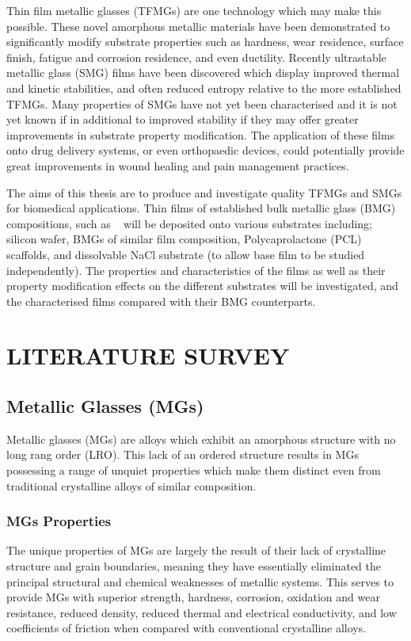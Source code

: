 \documentclass[a4paper,12pt,oneside]{report}%
\begin{document}
Thin film metallic glasses (TFMGs) are one technology which may make this possible. These novel amorphous metallic materials have been demonstrated to significantly modify substrate properties such as hardness, wear residence, surface finish, fatigue and corrosion residence, and even ductility. Recently ultrastable metallic glass (SMG) films have been discovered which display improved thermal and kinetic stabilities, and often reduced entropy relative to the more established TFMGs. Many properties of SMGs have not yet been characterised and it is not yet known if in additional to improved stability if they may offer greater improvements in substrate property modification. The application of these films onto drug delivery systems, or even orthopaedic devices, could potentially provide great improvements in wound healing and pain management practices.

The aims of this thesis are to produce and investigate quality TFMGs and SMGs for biomedical applications. Thin films of established bulk metallic glass (BMG) compositions, such as \MgZnCa~ will be deposited onto various substrates including; silicon wafer, BMGs of similar film composition, Polycaprolactone (PCL) scaffolds, and dissolvable NaCl substrate (to allow base film to be studied independently). The properties and characteristics of the films as well as their property modification effects on the different substrates will be investigated, and the characterised films compared with their BMG counterparts. 

\chapter{LITERATURE SURVEY} 

\section{Metallic Glasses (MGs)}
Metallic glasses (MGs) are alloys which exhibit an amorphous structure with no long rang order (LRO). This lack of an ordered structure results in MGs possessing a range of unquiet properties which make them distinct even from traditional crystalline alloys of similar composition.

\subsection{MGs Properties}
The unique properties of MGs are largely the result of their lack of crystalline structure and grain boundaries, meaning they have essentially eliminated the principal structural and chemical weaknesses of metallic systems. This serves to provide MGs with superior strength, hardness, corrosion, oxidation and wear resistance, reduced density, reduced thermal and electrical conductivity, and low coefficients of friction when compared with conventional crystalline alloys. 
 
\end{document}
